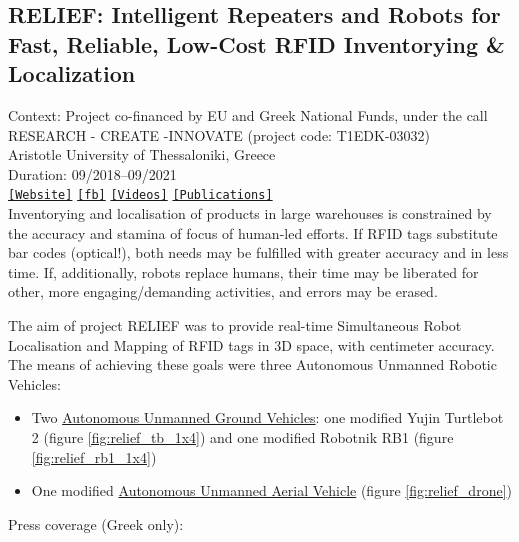 \subsection{RELIEF: Intelligent Repeaters and Robots for Fast, Reliable, Low-Cost RFID Inventorying \& Localization}

\noindent Context: Project co-financed by EU and Greek National Funds, under the call RESEARCH - CREATE -INNOVATE (project code: T1EDK-03032)\\
\noindent Aristotle University of Thessaloniki, Greece\\
\noindent Duration: 09/2018--09/2021\\

\noindent \href{http://relief.web.auth.gr/language/en/home/}{\texttt{[Website]}} \href{https://www.facebook.com/ReliefAuth}{\texttt{[fb]}} \href{https://www.youtube.com/@antonidimi/search?query=relief}{\texttt{[Videos]}} \href{https://relief.web.auth.gr/language/en/publications/}{\texttt{[Publications]}} \\

Inventorying and localisation of products in large warehouses is constrained by
the accuracy and stamina of focus of human-led efforts. If RFID tags substitute
bar codes (optical!), both needs may be fulfilled with greater accuracy and in
less time. If, additionally, robots replace humans, their time may be liberated
for other, more engaging/demanding activities, and errors may be erased.

The aim of project RELIEF was to provide real-time Simultaneous Robot
Localisation and Mapping of RFID tags in 3D space, with centimeter accuracy. The
means of achieving these goals were three Autonomous Unmanned Robotic Vehicles:

\begin{itemize}
  \item Two
        \href{https://www.youtube.com/watch?v=bo4lMI640DY}{Autonomous Unmanned Ground Vehicles}:
        one modified Yujin Turtlebot 2 (figure \ref{fig:relief_tb_1x4}) and one
        modified Robotnik RB1 (figure \ref{fig:relief_rb1_1x4})
  \item One modified
        \href{https://www.youtube.com/watch?v=9YpBIaO4tgY}{Autonomous Unmanned Aerial Vehicle}
        (figure \ref{fig:relief_drone})
\end{itemize}

\noindent Press coverage (Greek only):

